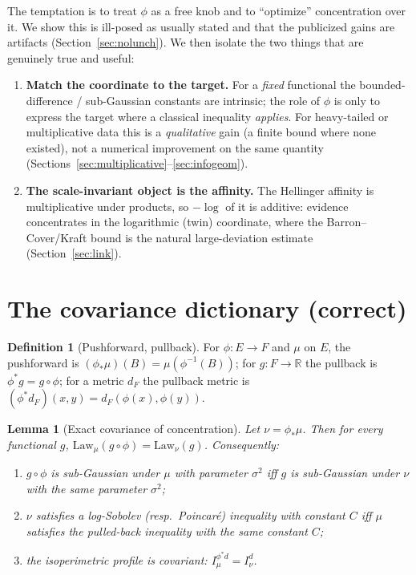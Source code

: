 \documentclass[11pt]{article}
\theoremstyle{plain}
\newtheorem{lemma}[theorem]{Lemma}
\theoremstyle{definition}
\newtheorem{definition}[theorem]{Definition}
\theoremstyle{remark}
\newcommand{\R}{\mathbb{R}}
\begin{document}
The temptation is to treat $\phi$ as a free knob and to ``optimize''
concentration over it. We show this is ill-posed as usually stated and that the
publicized gains are artifacts (Section~\ref{sec:nolunch}). We then isolate the
two things that are genuinely true and useful:
\begin{enumerate}[label=(\roman*)]
\item \textbf{Match the coordinate to the target.} For a \emph{fixed} functional
the bounded-difference / sub-Gaussian constants are intrinsic; the role of $\phi$
is only to express the target where a classical inequality \emph{applies}. For
heavy-tailed or multiplicative data this is a \emph{qualitative} gain (a finite
bound where none existed), not a numerical improvement on the same quantity
(Sections~\ref{sec:multiplicative}--\ref{sec:infogeom}).
\item \textbf{The scale-invariant object is the affinity.} The Hellinger affinity
is multiplicative under products, so $-\log$ of it is additive: evidence
concentrates in the logarithmic (twin) coordinate, where the Barron--Cover/Kraft
bound is the natural large-deviation estimate (Section~\ref{sec:link}).
\end{enumerate}

\section{The covariance dictionary (correct)}
\label{sec:dictionary}

\begin{definition}[Pushforward, pullback]\label{def:pp}
For $\phi:E\to F$ and $\mu$ on $E$, the pushforward is
$(\phi_*\mu)(B)=\mu(\phi^{-1}(B))$; for $g:F\to\R$ the pullback is
$\phi^*g=g\circ\phi$; for a metric $d_F$ the pullback metric is
$(\phi^*d_F)(x,y)=d_F(\phi(x),\phi(y))$.
\end{definition}

\begin{lemma}[Exact covariance of concentration]\label{lem:cov}
Let $\nu=\phi_*\mu$. Then for every functional $g$,
$\mathrm{Law}_\mu(g\circ\phi)=\mathrm{Law}_\nu(g)$. Consequently:
\begin{enumerate}[label=(\alph*)]
\item $g\circ\phi$ is sub-Gaussian under $\mu$ with parameter $\sigma^2$ iff $g$
is sub-Gaussian under $\nu$ with the same parameter $\sigma^2$;
\item $\nu$ satisfies a log-Sobolev (resp.\ Poincar\'e) inequality with constant
$C$ iff $\mu$ satisfies the pulled-back inequality with the \emph{same} constant
$C$;
\item the isoperimetric profile is covariant: $I_\mu^{\phi^*d}=I_\nu^{d}$.
\end{enumerate}
\end{lemma}
\end{document}
